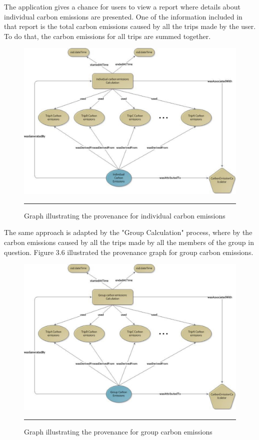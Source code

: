The application gives a chance for users to view a report where details about individual carbon emissions are presented. One of the information included in that report is the total carbon emissions caused by all the trips made by the user. To do that, the carbon emissions for all trips are summed together.

\begin{figure}[htbp]
	\centering
		\includegraphics[scale=0.40]{./Figures/chapter3/figure5.pdf}
		\rule{35em}{0.5pt}
	\caption[Graph illustrating the provenance for individual carbon emissions]{Graph illustrating the provenance for individual carbon emissions}
	\label{fig:provIndividualCo2Graph}
\end{figure}

The same approach is adapted by the "Group Calculation" process, where by the carbon emissions caused by all the trips made by all the members of the group in question. Figure 3.6 illustrated the provenance graph for group carbon emissions.

\begin{figure}[htbp]
	\centering
		\includegraphics[scale=0.40]{./Figures/chapter3/figure6.pdf}
		\rule{35em}{0.5pt}
	\caption[Graph illustrating the provenance for group carbon emissions]{Graph illustrating the provenance for group carbon emissions}
	\label{fig:provGroupCo2Graph}
\end{figure}

